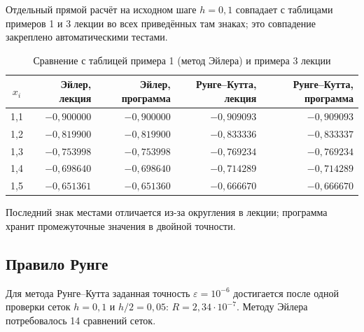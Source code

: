 \documentclass[12pt,a4paper]{article}
\begin{document}
Отдельный прямой расчёт на исходном шаге $h=0{,}1$ совпадает с таблицами
примеров 1 и 3 лекции во всех приведённых там знаках; это совпадение
закреплено автоматическими тестами.

\begin{table}[H]\centering\small\setlength{\tabcolsep}{4pt}
\caption{Сравнение с таблицей примера 1 (метод Эйлера) и примера 3 лекции}
\begin{tabular}{crrrr}\toprule
$x_i$ & Эйлер, лекция & Эйлер, программа & Рунге--Кутта, лекция & Рунге--Кутта, программа\\\midrule
1{,}1 & $-0{,}900000$ & $-0{,}900000$ & $-0{,}909093$ & $-0{,}909093$\\
1{,}2 & $-0{,}819900$ & $-0{,}819900$ & $-0{,}833336$ & $-0{,}833337$\\
1{,}3 & $-0{,}753998$ & $-0{,}753998$ & $-0{,}769234$ & $-0{,}769234$\\
1{,}4 & $-0{,}698640$ & $-0{,}698640$ & $-0{,}714289$ & $-0{,}714289$\\
1{,}5 & $-0{,}651361$ & $-0{,}651360$ & $-0{,}666670$ & $-0{,}666670$\\\bottomrule
\end{tabular}\end{table}

Последний знак местами отличается из-за округления в лекции; программа
хранит промежуточные значения в двойной точности.

\subsection{Правило Рунге}
Для метода Рунге--Кутта заданная точность $\varepsilon=10^{-6}$ достигается
после одной проверки сеток $h=0{,}1$ и $h/2=0{,}05$:
$R=2{,}34\cdot10^{-7}$. Методу Эйлера потребовалось 14 сравнений сеток.
\end{document}
